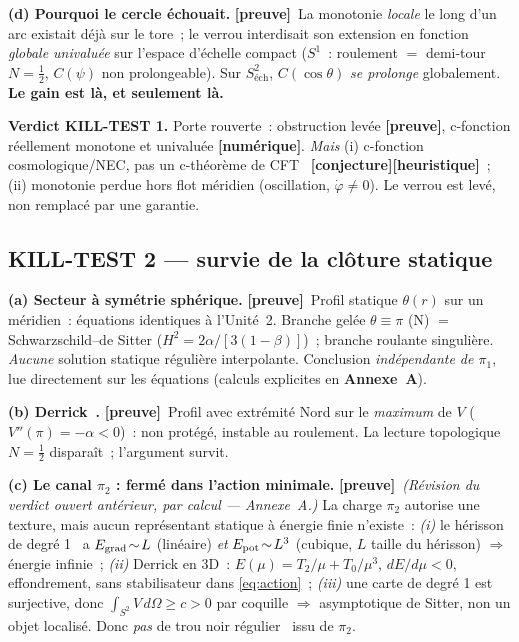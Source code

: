 \documentclass[11pt]{article}
\newcommand{\preuve}{{\small\textbf{[preuve]}}}
\newcommand{\num}{{\small\textbf{[num\'erique]}}}
\newcommand{\conj}{{\small\textbf{[conjecture]}}}
\newcommand{\heur}{{\small\textbf{[heuristique]}}}
\newcommand{\Npole}{\mathrm{N}}
\newcommand{\Stwo}{S^2_{\text{\'ech}}}
\theoremstyle{definition}
\begin{document}
\textbf{(d) Pourquoi le cercle \'echouait.} \preuve\ La monotonie \emph{locale} le long d'un arc existait
d\'ej\`a sur le tore~; le verrou interdisait son extension en fonction \emph{globale univalu\'ee} sur
l'espace d'\'echelle compact ($S^1$~: roulement $=$ demi-tour $N=\tfrac12$, $C(\psi)$ non prolongeable).
Sur $\Stwo$, $C(\cos\theta)$ \emph{se prolonge} globalement. \textbf{Le gain est l\`a, et seulement l\`a.}

\textbf{Verdict KILL-TEST 1.} Porte rouverte~: obstruction lev\'ee \preuve, c-fonction r\'eellement
monotone et univalu\'ee \num. \emph{Mais} (i) c-fonction cosmologique/NEC, pas un c-th\'eor\`eme de CFT~\cite{Zamolodchikov1986,Cardy1988,KomargodskiSchwimmer2011}
\conj\heur~; (ii) monotonie perdue hors flot m\'eridien (oscillation, $\dot\varphi\ne0$). Le verrou est
lev\'e, non remplac\'e par une garantie.

\subsection{KILL-TEST 2 --- survie de la cl\^oture statique}\label{sec:kt2}
\textbf{(a) Secteur \`a sym\'etrie sph\'erique.} \preuve\ Profil statique $\theta(r)$ sur un m\'eridien~:
\'equations identiques \`a l'Unit\'e~2. Branche gel\'ee $\theta\equiv\pi$ ($\Npole$) $=$
Schwarzschild--de Sitter ($H^2=2\alpha/[3(1-\beta)]$)~; branche roulante singuli\`ere. \emph{Aucune}
solution statique r\'eguli\`ere interpolante. Conclusion \emph{ind\'ependante de $\pi_1$}, lue directement
sur les \'equations (calculs explicites en \textbf{Annexe~A}).

\textbf{(b) Derrick~\cite{Derrick1964}.} \preuve\ Profil avec extr\'emit\'e Nord sur le \emph{maximum} de $V$
($V''(\pi)=-\alpha<0$)~: non prot\'eg\'e, instable au roulement. La lecture topologique $N=\tfrac12$
dispara\^it~; l'argument survit.

\textbf{(c) Le canal $\pi_2$ : ferm\'e dans l'action minimale.} \preuve\ \emph{(R\'evision du verdict
ouvert ant\'erieur, par calcul --- Annexe~A.)} La charge $\pi_2$ autorise une texture, mais aucun
repr\'esentant statique \`a \'energie finie n'existe~: \emph{(i)} le h\'erisson de degr\'e 1~\cite{BelavinPolyakov1975,BarriolaVilenkin1989} a
$E_{\rm grad}\!\sim\!L$ (lin\'eaire) \emph{et} $E_{\rm pot}\!\sim\!L^3$ (cubique, $L$ taille du h\'erisson) $\Rightarrow$ \'energie
infinie~; \emph{(ii)} Derrick en 3D~: $E(\mu)=T_2/\mu+T_0/\mu^3$, $dE/d\mu<0$, effondrement, sans
stabilisateur dans \eqref{eq:action}~; \emph{(iii)} une carte de degr\'e 1 est surjective, donc
$\int_{S^2}V\,d\Omega\ge c>0$ par coquille $\Rightarrow$ asymptotique de Sitter, non un objet localis\'e.
Donc \emph{pas} de trou noir r\'egulier~\cite{Bardeen1968,Hayward2006} issu de $\pi_2$.
\end{document}
